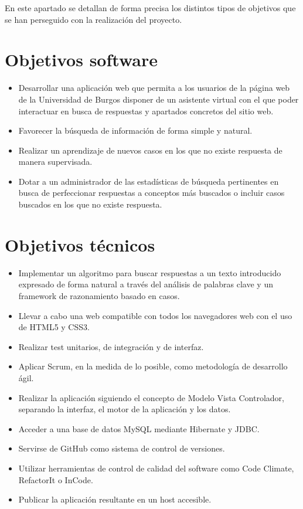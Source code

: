 
En este apartado se detallan de forma precisa los distintos tipos de objetivos que se han perseguido con la realización del proyecto.

\section{Objetivos software}\label{objetivos-software}

\begin{itemize}
\tightlist
\item
  Desarrollar una aplicación web que permita a los usuarios de la página web de la Universidad de Burgos disponer de un asistente virtual con el que poder interactuar en busca de respuestas y apartados concretos del sitio web.
\item
  Favorecer la búsqueda de información de forma simple y natural.
\item
  Realizar un aprendizaje de nuevos casos en los que no existe respuesta de manera supervisada.
\item
  Dotar a un administrador de las estadísticas de búsqueda pertinentes en busca de perfeccionar respuestas a conceptos más buscados o incluir casos buscados en los que no existe respuesta.
\end{itemize}

\section{Objetivos técnicos}\label{objetivos-tecnicos}

\begin{itemize}
\tightlist
\item
Implementar un algoritmo para buscar respuestas a un texto introducido expresado de forma natural a través del análisis de palabras clave y un framework de razonamiento basado en casos.
\item
Llevar a cabo una web compatible con todos los navegadores web con el uso de HTML5 y CSS3.
\item
Realizar test unitarios, de integración y de interfaz.
\item
Aplicar Scrum, en la medida de lo posible, como metodología de desarrollo ágil.
\item
Realizar la aplicación siguiendo el concepto de Modelo Vista Controlador, separando la interfaz, el motor de la aplicación y los datos.
\item
Acceder a una base de datos MySQL mediante Hibernate y JDBC.
\item
Servirse de GitHub como sistema de control de versiones.
\item
Utilizar herramientas de control de calidad del software como Code Climate, RefactorIt o InCode.
\item
Publicar la aplicación resultante en un host accesible.

\end{itemize}

